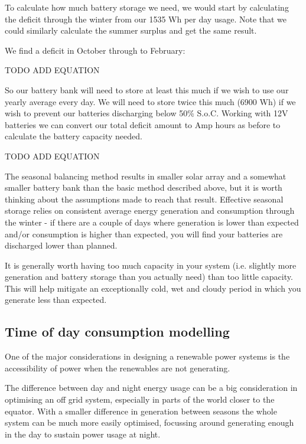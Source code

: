 \documentclass{article}
\theoremstyle{definition}
\theoremstyle{definition}
\theoremstyle{remark}
\begin{document}
    To calculate how much battery storage we need, we would start by calculating the deficit through the winter from our 1535 Wh per day usage. Note that we could similarly calculate the summer surplus and get the same result.

    We find a deficit in October through to February:

    TODO ADD EQUATION

    So our battery bank will need to store at least this much if we wish to use our yearly average every day. We will need to store twice this much (6900 Wh) if we wish to prevent our batteries discharging below 50\% S.o.C. Working with 12V batteries we can convert our total deficit amount to Amp hours as before to calculate the battery capacity needed.

    TODO ADD EQUATION

    The seasonal balancing method results in smaller solar array and a somewhat smaller battery bank than the basic method described above, but it is worth thinking about the assumptions made to reach that result. Effective seasonal storage relies on consistent average energy generation and consumption through the winter - if there are a couple of days where generation is lower than expected and/or consumption is higher than expected, you will find your batteries are discharged lower than planned. 

    It is generally worth having too much capacity in your system (i.e. slightly more generation and battery storage than you actually need) than too little capacity. This will help mitigate an exceptionally cold, wet and cloudy period in which you generate less than expected. 
  

  {\color{blue}\subsection{Time of day consumption modelling}} %
  \label{sub:time_of_day_consumption_modelling}

    One of the major considerations in designing a renewable power systems is the accessibility of power when the renewables are not generating.

    The difference between day and night energy usage can be a big consideration in optimising an off grid system, especially in parts of the world closer to the equator. With a smaller difference in generation between seasons the whole system can be much more easily optimised, focussing around generating enough in the day to sustain power usage at night.
\end{document}
